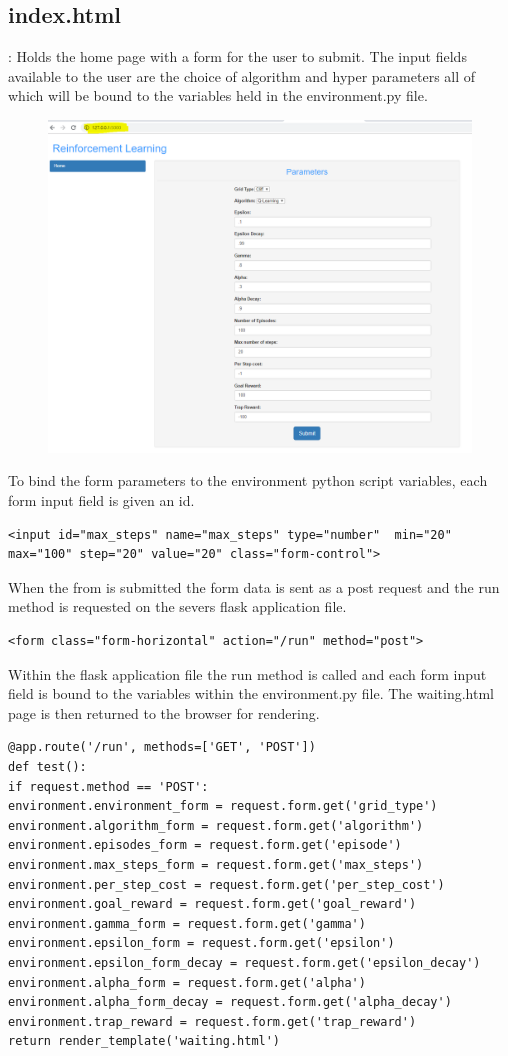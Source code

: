 \subsection{index.html}:
Holds the home page with a form for the user to submit. The input fields available to the user are the choice of algorithm and hyper parameters all of which will be bound to the variables held in the environment.py file.
\begin{figure}[H]
	\centering
	\includegraphics[width=0.7\linewidth]{img/homePage}
	\caption{}
	\label{fig:homepage}
\end{figure}
To bind the form parameters to the environment python script variables, each form input field is given an id.
\begin{verbatim}
<input id="max_steps" name="max_steps" type="number"  min="20"
max="100" step="20" value="20" class="form-control">
\end{verbatim}
When the from is submitted the form data is sent as a post request and the run method is requested on the severs flask application file.
\begin{verbatim}
<form class="form-horizontal" action="/run" method="post">
\end{verbatim}
Within the flask application file the run method is called and each form input field is bound to the variables within the environment.py file. The waiting.html page is then returned to the browser for rendering.
\begin{verbatim}
@app.route('/run', methods=['GET', 'POST'])
def test():	
if request.method == 'POST':
environment.environment_form = request.form.get('grid_type')
environment.algorithm_form = request.form.get('algorithm')
environment.episodes_form = request.form.get('episode')
environment.max_steps_form = request.form.get('max_steps')
environment.per_step_cost = request.form.get('per_step_cost')
environment.goal_reward = request.form.get('goal_reward')
environment.gamma_form = request.form.get('gamma')
environment.epsilon_form = request.form.get('epsilon')
environment.epsilon_form_decay = request.form.get('epsilon_decay')
environment.alpha_form = request.form.get('alpha')
environment.alpha_form_decay = request.form.get('alpha_decay')
environment.trap_reward = request.form.get('trap_reward')
return render_template('waiting.html')
\end{verbatim}



